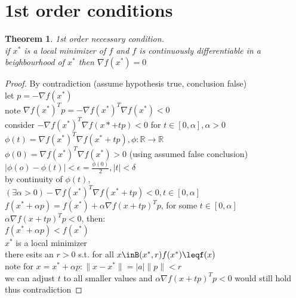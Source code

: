 \documentclass[12pt,letter]{article}
\newcommand{\R}{\mathbb{R}}
\newcommand{\norm}[1]{\|#1\|}
\newtheorem{theorem}{Theorem}[section]
\begin{document}
  \pagebreak

  \section{1st order conditions}
  
  \begin{theorem}
    1st order necessary condition.\\
  if $x^*$ is a local minimizer of $f$ and $f$ is continuously differentiable in a beighbourhood of $x^*$ then $\nabla f(x^*)=0$\\
\end{theorem}
\begin{proof}
  By contradiction (assume hypothesis true, conclusion false)\\
  let $p= -\nabla f(x^*)$\\
  note $\nabla f(x^*)^T p = - \nabla f(x^*)^T \nabla f(x^*) < 0$\\
  consider $- \nabla f(x^*)^T \nabla f(x* + tp)<0$ for $t\in[0,\alpha], \alpha>0$\\
  $\phi(t)=\nabla f(x^*)^T \nabla f(x^*+tp), \phi: \R \to \R$\\
  $\phi(0)=\nabla f(x^*)^T \nabla f(x^*)> 0$ (using assumed false conclusion)\\
  $| \phi(o) -\phi(t)| < \epsilon = \frac{\phi(0)}{2}, |t| < \delta$\\
  by continuity of $\phi(t)$,\\
  $(\exists \alpha >0) - \nabla f(x^*)^T \nabla f(x^*+tp) <0, t\in[0,\alpha]$\\
  $f(x^*+\alpha p)=f(x^*)+\alpha \nabla f(x+tp)^T p$, for some $t\in[0,\alpha]$\\
  $\alpha \nabla f(x+tp)^T p<0$, then:\\
  $f(x^*+\alpha p) < f(x^*)$\\
  $x^*$ is a local minimizer\\
  there esits an $r>0$ s.t. for all $x\inB(x^*,r) f(x^*)\leqf(x)$\\
  note for $x=x^*+\alpha p: \norm{x-x^*}=|a|\norm{p}<r$\\
  we can adjust $t$ to all smaller values and $\alpha \nabla f(x+tp)^T p<0$ would still hold\\
  thus contradiction
\end{proof}
\end{document}
